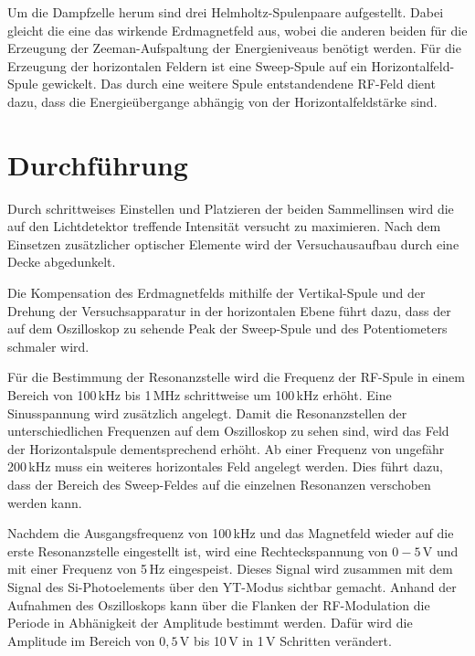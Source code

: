\noindent Um die Dampfzelle herum sind drei Helmholtz-Spulenpaare aufgestellt. Dabei gleicht die eine das wirkende
Erdmagnetfeld aus, wobei die anderen beiden für die Erzeugung der Zeeman-Aufspaltung der
Energieniveaus benötigt werden. Für die Erzeugung der horizontalen Feldern ist eine Sweep-Spule auf ein Horizontalfeld-Spule
gewickelt. \newline
Das durch eine weitere Spule entstandendene RF-Feld dient dazu, dass die Energieübergange abhängig von
der Horizontalfeldstärke sind.

\section{Durchführung}
Durch schrittweises Einstellen und Platzieren der beiden Sammellinsen wird die auf den Lichtdetektor
treffende Intensität versucht zu maximieren. Nach dem Einsetzen zusätzlicher optischer Elemente wird
der Versuchausaufbau durch eine Decke abgedunkelt.

Die Kompensation des Erdmagnetfelds mithilfe der Vertikal-Spule und der Drehung der Versuchsapparatur in der
horizontalen Ebene führt dazu, dass der auf dem Oszilloskop zu sehende Peak der Sweep-Spule und des Potentiometers
schmaler wird.

Für die Bestimmung der Resonanzstelle wird die Frequenz der RF-Spule in einem Bereich von 100\,kHz bis
1\,MHz schrittweise um 100\,kHz erhöht. Eine Sinusspannung wird zusätzlich angelegt.
Damit die Resonanzstellen der unterschiedlichen Frequenzen auf dem Oszilloskop zu sehen sind, wird
das Feld der Horizontalspule dementsprechend erhöht.
Ab einer Frequenz von ungefähr 200\,kHz muss ein weiteres horizontales Feld angelegt werden. Dies führt dazu,
dass der Bereich des Sweep-Feldes auf die einzelnen Resonanzen verschoben werden kann.

Nachdem die Ausgangsfrequenz von 100\,kHz und das Magnetfeld wieder auf die erste Resonanzstelle eingestellt ist,
wird eine Rechteckspannung von $0-5$\,V und mit einer Frequenz von 5\,Hz eingespeist. Dieses Signal
wird zusammen mit dem Signal des Si-Photoelements über den YT-Modus sichtbar gemacht.
Anhand der Aufnahmen des Oszilloskops kann über die Flanken der RF-Modulation
die Periode in Abhänigkeit der Amplitude bestimmt werden. Dafür wird die Amplitude im Bereich von $0,5$\,V bis 10\,V
in 1\,V Schritten verändert.

